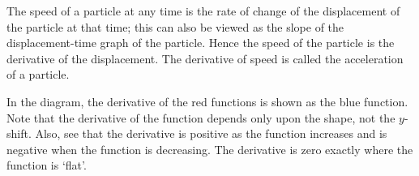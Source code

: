 \begin{ex}
  The speed of a particle at any time is the rate of change of the displacement of the particle at that time;
  this can also be viewed as the slope of the displacement-time graph of the particle. Hence the speed of the
  particle is the derivative of the displacement. The derivative of speed is called the acceleration of a particle.
\end{ex}

\begin{ex}
  In the diagram, the derivative of the red functions is shown as the blue function. Note
  that the derivative of the function depends only upon the shape, not the $ y$-shift. Also,
  see that the derivative is positive as the function increases and is negative when the
  function is decreasing. The derivative is zero exactly where the function is `flat'.

  \begin{center}
  \end{center}
\end{ex}

\clearpage
